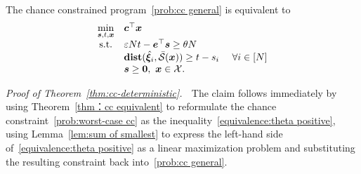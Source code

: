 \documentclass[nonblindrev]{informs2017}
\newcommand{\bmh}[1]{\hat{\bm{#1}}}
\newcommand{\1}[1]{\mathds{1}{\left(#1\right)}}
\begin{document}
\begin{theorem}\label{thm:cc-deterministic}
The chance constrained program~\eqref{prob:cc general} is equivalent to 
\begin{equation}\label{prob:cc reformulation}
\begin{array}{cll}
\displaystyle \min_{\bm{s}, t, \bm{x}} & \bm{c}^\top\bm{x} \\
{\rm s.t.} & \varepsilon N t - \bm{e}^\top\bm{s} \geq \theta N \\
& \mathbf{dist}(\bmh{\xi}_i, \bar{\mathcal{S}}(\bm{x})) \geq t - s_i &~\forall i \in [N] \\
& \bm{s} \geq \bm{0}, ~\bm{x} \in \mathcal{X}.
\end{array}
\end{equation}
\end{theorem}
\noindent \emph{Proof of Theorem~\ref{thm:cc-deterministic}.} $\;$
The claim follows immediately by using Theorem~\ref{thm：cc equivalent} to reformulate the chance constraint~\eqref{prob:worst-case cc} as the inequality~\eqref{equivalence:theta positive}, using Lemma~\ref{lem:sum of smallest} to express the left-hand side of~\eqref{equivalence:theta positive} as a linear maximization problem and substituting the resulting constraint back into~\eqref{prob:cc general}.
\hfill \Halmos
\endproof 
\end{document}
